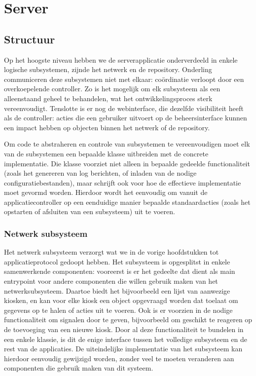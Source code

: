 \part{Server}
\label{server}


\chapter{Structuur}

Op het hoogste niveau hebben we de serverapplicatie onderverdeeld in enkele logische subsystemen, zijnde het netwerk en de repository. Onderling communiceren deze subsystemen niet met elkaar: coördinatie verloopt door een overkoepelende controller. Zo is het mogelijk om elk subsysteem als een alleenstaand geheel te behandelen, wat het ontwikkelingsproces sterk vereenvoudigt. Tenslotte is er nog de webinterface, die dezelfde visibiliteit heeft als de controller: acties die een gebruiker uitvoert op de beheersinterface kunnen een impact hebben op objecten binnen het netwerk of de repository.

Om code te abstraheren en controle van subsystemen te vereenvoudigen moet elk van de subsystemen een bepaalde klasse uitbreiden met de concrete implementatie. Die klasse voorziet niet alleen in bepaalde gedeelde functionaliteit (zoals het genereren van log berichten, of inladen van de nodige configuratiebestanden), maar schrijft ook voor hoe de effectieve implementatie moet gevormd worden. Hierdoor wordt het eenvoudig om vanuit de applicatiecontroller op een eenduidige manier bepaalde standaardacties (zoals het opstarten of afsluiten van een subsysteem) uit te voeren.

\section{Netwerk subsysteem}

Het netwerk subsysteem verzorgt wat we in de vorige hoofdstukken tot applicatieprotocol gedoopt hebben. Het subsysteem is opgesplitst in enkele samenwerkende componenten: vooreerst is er het gedeelte dat dient als main entrypoint voor andere componenten die willen gebruik maken van het netwerksubsysteem. Daartoe biedt het bijvoorbeeld een lijst van aanwezige kiosken, en kan voor elke kiosk een object opgevraagd worden dat toelaat om gegevens op te halen of acties uit te voeren. Ook is er voorzien in de nodige functionaliteit om signalen door te geven, bijvoorbeeld om geschikt te reageren op de toevoeging van een nieuwe kiosk.
Door al deze functionaliteit te bundelen in een enkele klassie, is dit de enige interface tussen het volledige subsysteem en de rest van de applicaties. De uiteindelijke implementatie van het subsysteem kan hierdoor eenvoudig gewijzigd worden, zonder veel te moeten veranderen aan componenten die gebruik maken van dit systeem.

